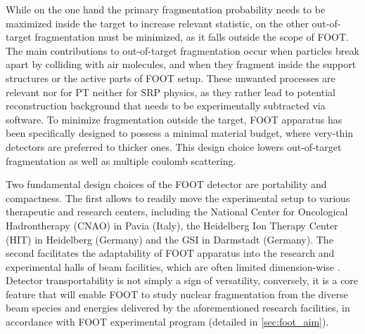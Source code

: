 While on the one hand the primary fragmentation probability needs to be maximized inside the target to increase relevant statistic, on the other out-of-target fragmentation must be minimized, as it falls outside the scope of FOOT. The main contributions to out-of-target fragmentation occur when particles break apart by colliding with air molecules, and when they fragment inside the support structures or the active parts of FOOT setup. These unwanted processes are relevant nor for PT neither for SRP physics, as they rather lead to potential reconstruction background that needs to be experimentally subtracted via software. To minimize fragmentation outside the target, FOOT apparatus has been specifically designed to possess a minimal material budget, where very-thin detectors are preferred to thicker ones. This design choice lowers out-of-target fragmentation as well as multiple coulomb scattering.

Two fundamental design choices of the FOOT detector are portability and compactness. The first allows to readily move the experimental setup to various therapeutic and research centers, including the National Center for Oncological Hadrontherapy (CNAO) in Pavia (Italy), the Heidelberg Ion Therapy Center (HIT) in Heidelberg (Germany) and the GSI in Darmstadt (Germany). The second facilitates the adaptability of FOOT apparatus into the research and experimental halls of beam facilities, which are often limited dimension-wise \cite{experimentalHallDim}. Detector transportability is not simply a sign of versatility, conversely, it is a core feature that will enable FOOT to study nuclear fragmentation from the diverse beam species and energies delivered by the aforementioned research facilities, in accordance with FOOT experimental program (detailed in \autoref{sec:foot_aim}).

